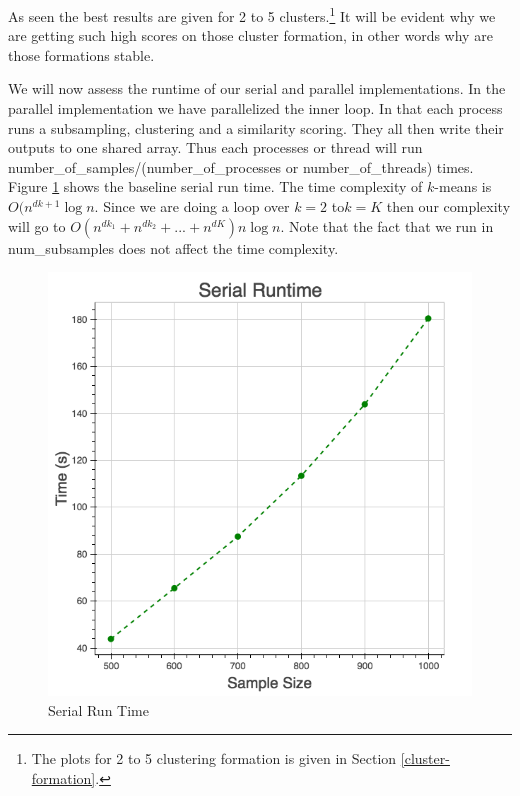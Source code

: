 \documentclass[10pt,twocolumn,letterpaper]{article}
\begin{document}
As seen the best results are given for 2 to 5 clusters.\footnote{The plots for 2 to 5 clustering formation is given in Section \ref{cluster-formation}.} It will be evident why we are getting such high scores on those cluster
formation, in other words why are those formations stable. 

We will now assess the runtime of our serial and parallel implementations.
In the parallel implementation we have parallelized the inner loop.
In that each process runs a subsampling, clustering and a similarity
scoring. They all then write their outputs to one shared array. Thus
each processes or thread will run number\_of\_samples/(number\_of\_processes
or number\_of\_threads) times. Figure \ref{fig:Serial-Run-Time} shows
the baseline serial run time. The time complexity of $k$-means is $O(n^{dk+1}\log n$.
Since we are doing a loop over $k=2$ to$ k=K$ then our complexity will
go to $O(n^{dk_1}+n^{dk_2}+ ... +n^{dK})n \log n$. Note that the fact
that we run in num\_subsamples does not affect the time complexity. 

\begin{figure}[htbp] 
\begin{center}
\includegraphics[scale=0.35]{figure/serial.png}
\end{center}
\caption{\label{fig:Serial-Run-Time}Serial Run Time}
\end{figure}
\end{document}
